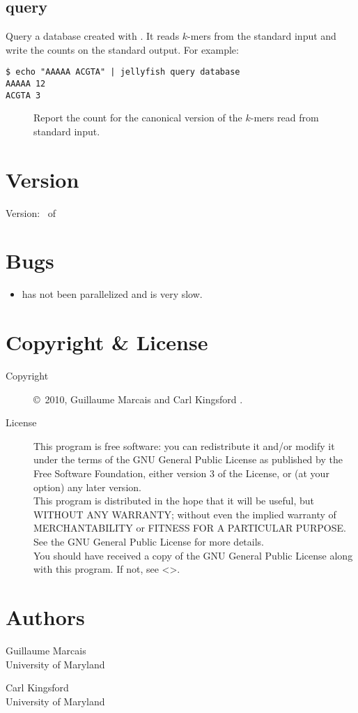 \documentclass[english]{article}
\newcommand{\ddash}[1]{-\,-#1}
\newcommand{\LOpt}[1]{\Opt{\ddash{#1}}}
\begin{document}
\subsection{query}

Query a database created with . It reads
$k$-mers from the standard input and write the counts on the standard
output. For example:

\begin{verbatim}
$ echo "AAAAA ACGTA" | jellyfish query database
AAAAA 12
ACGTA 3
\end{verbatim}

\begin{description}
\item[\LOpt{both-strands}] Report the count for the canonical version of
  the $k$-mers read from standard input.
\end{description}

\section{Version}

Version: \Version\ of \Date

\section{Bugs}

\begin{itemize}
\item {} has not been parallelized and is very
  slow.
\end{itemize}

\section{Copyright \& License}
\begin{description}
\item[Copyright] \copyright\ 2010, Guillaume Marcais  and Carl Kingsford .

\item[License] This program is free software: you can redistribute it
  and/or modify it under the terms of the GNU General Public License
  as published by the Free Software Foundation, either version 3 of
  the License, or (at your option) any later version. \\
  This program is distributed in the hope that it will be useful, but
  WITHOUT ANY WARRANTY; without even the implied warranty of
  MERCHANTABILITY or FITNESS FOR A PARTICULAR PURPOSE.  See the GNU
  General Public License for more details. \\
  You should have received a copy of the GNU General Public License
  along with this program.  If not, see
  <>.
\end{description}

\section{Authors}
\noindent
Guillaume Marcais \\
University of Maryland \\

Carl Kingsford \\
University of Maryland \\

\LatexManEnd
\end{document}
